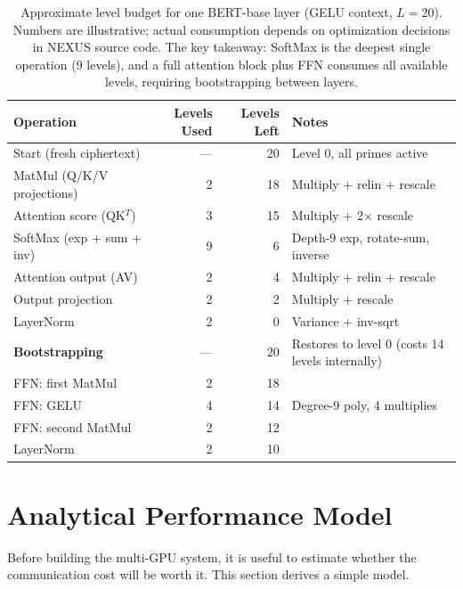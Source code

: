 \documentclass[11pt,letterpaper]{article}
\begin{document}
\begin{table}[h]
\centering
\begin{tabular}{@{}lrrp{5.5cm}@{}}
\toprule
\textbf{Operation} & \textbf{Levels Used} & \textbf{Levels Left} & \textbf{Notes} \\
\midrule
Start (fresh ciphertext)      & ---  & 20 & Level 0, all primes active \\
\midrule
MatMul (Q/K/V projections)    & 2    & 18 & Multiply + relin + rescale \\
Attention score (QK$^T$)      & 3    & 15 & Multiply + 2$\times$ rescale \\
SoftMax (exp + sum + inv)      & 9    & 6  & Depth-9 exp, rotate-sum, inverse \\
Attention output (AV)          & 2    & 4  & Multiply + relin + rescale \\
Output projection              & 2    & 2  & Multiply + rescale \\
LayerNorm                     & 2    & 0  & Variance + inv-sqrt \\
\midrule
\textbf{Bootstrapping}         & ---  & 20 & Restores to level 0 (costs 14 levels internally) \\
\midrule
FFN: first MatMul              & 2    & 18 & \\
FFN: GELU                      & 4    & 14 & Degree-9 poly, 4 multiplies \\
FFN: second MatMul             & 2    & 12 & \\
LayerNorm                     & 2    & 10 & \\
\bottomrule
\end{tabular}
\caption{Approximate level budget for one BERT-base layer (GELU context, $L=20$). Numbers
are illustrative; actual consumption depends on optimization decisions in NEXUS source code.
The key takeaway: SoftMax is the deepest single operation (9 levels), and a full attention
block plus FFN consumes all available levels, requiring bootstrapping between layers.}
\label{tab:levels}
\end{table}

\section{Analytical Performance Model}
\label{sec:perfmodel}

Before building the multi-GPU system, it is useful to estimate whether the communication
cost will be worth it. This section derives a simple model.
\end{document}
